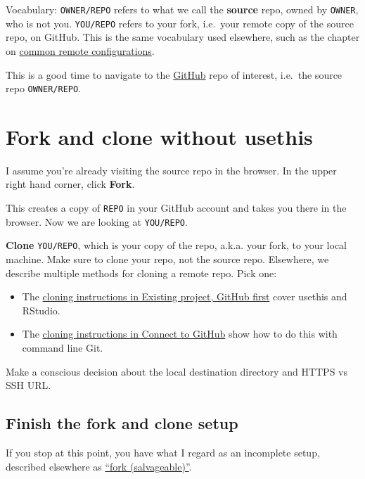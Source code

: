 \documentclass[
]{book}
\providecommand{\tightlist}{%
  \setlength{\itemsep}{0pt}\setlength{\parskip}{0pt}}
\begin{document}
Vocabulary: \texttt{OWNER/REPO} refers to what we call the \textbf{source} repo, owned by \texttt{OWNER}, who is not you.
\texttt{YOU/REPO} refers to your fork, i.e.~your remote copy of the source repo, on GitHub.
This is the same vocabulary used elsewhere, such as the chapter on \hyperref[common-remote-setups]{common remote configurations}.

This is a good time to navigate to the \href{https://github.com}{GitHub} repo of interest, i.e.~the source repo \texttt{OWNER/REPO}.

\section{Fork and clone without usethis}\label{fork-and-clone-without-usethis}

I assume you're already visiting the source repo in the browser.
In the upper right hand corner, click \textbf{Fork}.

This creates a copy of \texttt{REPO} in your GitHub account and takes you there in the browser.
Now we are looking at \texttt{YOU/REPO}.

\textbf{Clone} \texttt{YOU/REPO}, which is your copy of the repo, a.k.a. your fork, to your local machine.
Make sure to clone your repo, not the source repo.
Elsewhere, we describe multiple methods for cloning a remote repo.
Pick one:

\begin{itemize}
\tightlist
\item
  The \hyperref[git-clone-usethis-rstudio]{cloning instructions in Existing project, GitHub first}
  cover usethis and RStudio.
\item
  The \hyperref[git-clone-command-line]{cloning instructions in Connect to GitHub}
  show how to do this with command line Git.
\end{itemize}

Make a conscious decision about the local destination directory and HTTPS vs SSH URL.

\subsection{Finish the fork and clone setup}\label{fork-and-clone-finish}

If you stop at this point, you have what I regard as an incomplete setup, described elsewhere as \hyperref[fork_upstream_is_not_origin_parent]{``fork (salvageable)''}.
\end{document}

